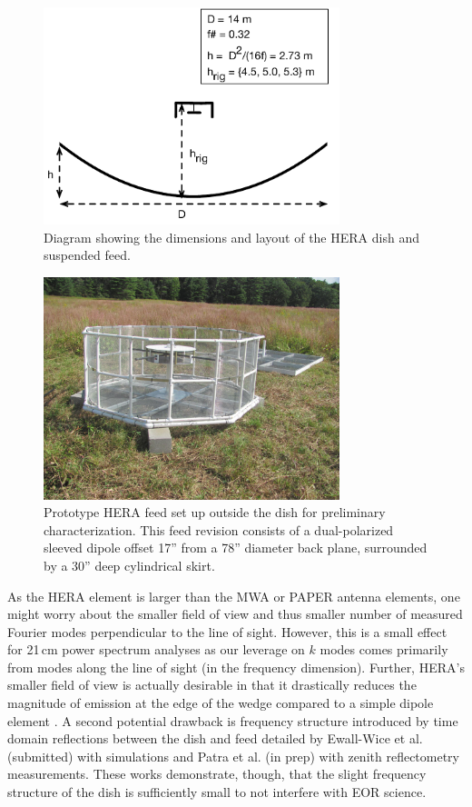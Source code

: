 \documentclass{emulateapj}
\begin{document}
\begin{figure}[h]
\includegraphics[width=3.4in]{dish_and_feed_diagram.pdf}
\caption{Diagram showing the dimensions and layout of the HERA dish and suspended feed.}
\label{fig:feeddiagram}
\end{figure}

\begin{figure}[h]
\includegraphics[width=3.4in]{feed.jpg}
\caption{Prototype HERA feed set up outside the dish for preliminary characterization. This feed revision consists of a dual-polarized sleeved dipole offset 17'' from a 78'' diameter back plane, surrounded by a 30'' deep cylindrical skirt.}
\label{fig:feedphoto}
\end{figure}

As the HERA element is larger than the MWA or PAPER antenna elements, one might worry about the  smaller field of view and thus smaller number of measured Fourier modes perpendicular to the line of sight. However, this is a 
small effect for 21\,cm power spectrum analyses as our leverage on $k$ modes comes primarily from modes along the line of sight (in the frequency dimension). Further, HERA's smaller field of view is actually desirable in that it drastically reduces the magnitude of emission at the edge of the wedge compared to a simple dipole element \citep{nithya15}. A second potential drawback is frequency structure introduced by time domain reflections between the dish and feed detailed by Ewall-Wice et al. (submitted) with simulations and Patra et al. (in prep) with zenith reflectometry measurements. These works demonstrate, though, that the slight frequency structure of the dish is sufficiently small to not interfere with EOR science.
\\
\end{document}
